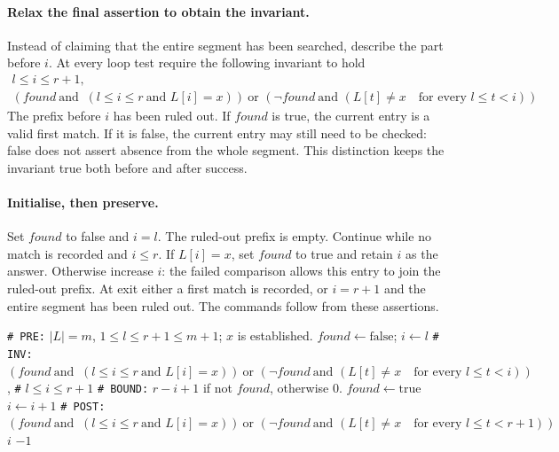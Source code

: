 \paragraph{Relax the final assertion to obtain the invariant.}
Instead of claiming that the entire segment has been searched, describe
the part before $i$. At every loop test require the following invariant to hold
\[
\begin{gathered}
l\leq i\leq r+1,\\
(found\ \text{and }\ (l\leq i\leq r\ \text{and }L[i]=x))\ \text{or } (\neg found\ \text{and } (L[t]\ne x\quad\text{for every }l\leq t<i))
\end{gathered}
\]
The prefix before $i$ has been ruled out. If $found$ is true, the current
entry is a valid first match. If it is false, the current entry may still
need to be checked: false does not assert absence from the whole segment.
This distinction keeps the invariant true both before and after success.

\paragraph{Initialise, then preserve.}
Set $found$ to false and $i=l$. The ruled-out prefix is empty.
Continue while no match is recorded and $i\leq r$. If $L[i]=x$, set
$found$ to true and retain $i$ as the answer. Otherwise increase $i$:
the failed comparison allows this entry to join the ruled-out prefix.
At exit either a first match is recorded, or $i=r+1$ and the entire
segment has been ruled out. The commands follow from these assertions.

\begin{algorithm}[H]
\begin{algorithmic}[1]
\Statex \texttt{\# PRE:} $|L|=m$, $1\leq l\leq r+1\leq m+1$; $x$ is established.
\State $found\leftarrow\mathrm{false}$; $i\leftarrow l$
\Statex \texttt{\# INV:} $(found\ \text{and }\ (l\leq i\leq r\ \text{and }L[i]=x))\ \text{or } (\neg found\ \text{and } (L[t]\ne x\quad\text{for every }l\leq t<i))$,
\Statex \texttt{\#}  $l\leq i\leq r+1$
\Statex \texttt{\# BOUND:} $r-i+1$ if not $found$, otherwise $0$.
\State $found\leftarrow\mathrm{true}$
\Else
\State $i\leftarrow i+1$
\EndIf
\EndWhile
\Statex \texttt{\# POST:} $(found\ \text{and }\ (l\leq i\leq r\ \text{and }L[i]=x))\ \text{or } (\neg found\ \text{and } (L[t]\ne x\quad\text{for every }l\leq t<r+1))$
\State \Return $i$
\Else
\State \Return $-1$
\EndIf
\EndProcedure
\end{algorithmic}
\caption{Search by extending a prefix known not to contain the target.}
\end{algorithm}

